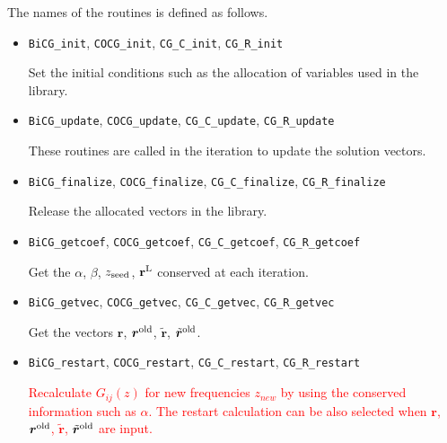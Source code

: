 \documentclass[12pt,titlepage]{article}
\begin{document}
The names of the routines is defined as follows. 
\begin{itemize}
\item \verb|BiCG_init|, \verb|COCG_init|, \verb|CG_C_init|, \verb|CG_R_init|

Set the initial conditions such as the allocation of variables used in the library. 

\item \verb|BiCG_update|, \verb|COCG_update|, \verb|CG_C_update|, \verb|CG_R_update|

These routines are called in the iteration to update the solution vectors.


\item \verb|BiCG_finalize|, \verb|COCG_finalize|, \verb|CG_C_finalize|, \verb|CG_R_finalize|

Release the allocated vectors in the library. 

\item \verb|BiCG_getcoef|, \verb|COCG_getcoef|, \verb|CG_C_getcoef|, \verb|CG_R_getcoef|

Get the $\alpha$, $\beta$, $z_{\rm seed}$, ${\bf r}^{\rm L}$ conserved at each iteration.

\item \verb|BiCG_getvec|, \verb|COCG_getvec|, \verb|CG_C_getvec|, \verb|CG_R_getvec|

Get the vectors
${\boldsymbol r}$, ${\boldsymbol r}^{\rm old}$, 
${\tilde {\boldsymbol r}}$, ${\tilde {\boldsymbol r}}^{\rm old}$.

\item \verb|BiCG_restart|, \verb|COCG_restart|, \verb|CG_C_restart|, \verb|CG_R_restart|

\textcolor{red}{
Recalculate $G_{i j}(z)$ for new frequencies $z_{new}$ by using the conserved information such as $\alpha$.
The restart calculation can be also selected 
when ${\boldsymbol r}$, ${\boldsymbol r}^{\rm old}$, 
${\tilde {\boldsymbol r}}$, ${\tilde {\boldsymbol r}}^{\rm old}$ are input.
}


\end{itemize}
\end{document}
